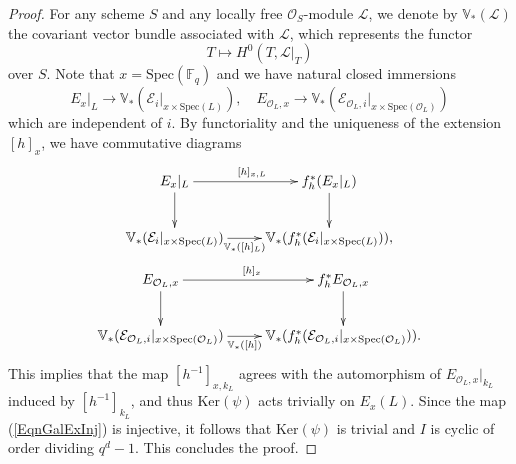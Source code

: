 \documentclass[10pt]{amsart}
\theoremstyle{plain}
\theoremstyle{definition}
\newcommand{\Ker}{\mathrm{Ker}}
\newcommand{\Spec}{\mathrm{Spec}}
\newcommand{\cE}{\mathcal{E}}
\newcommand{\cL}{\mathcal{L}}
\newcommand{\cO}{\mathcal{O}}
\newcommand{\bF}{\mathbb{F}}
\newcommand{\bV}{\mathbb{V}}
\begin{document}
\begin{proof}
	
	For any scheme $S$ and any locally free $\cO_S$-module $\cL$, we denote by $\bV_*(\cL)$ the covariant vector bundle associated with $\cL$,
	which represents the functor
	\[
	T\mapsto H^0(T,\cL|_T)
	\]
	over $S$.
	Note that $x=\Spec(\bF_q)$ and we have natural closed immersions 
	\[
	E_x|_L\to \bV_*(\cE_i|_{x\times \Spec(L)}),\quad E_{\cO_L,x}\to \bV_*(\cE_{\cO_L,i}|_{x\times \Spec(\cO_L)})
	\]
	which are independent of $i$. 
	By functoriality and the uniqueness of the extension $[h]_x$, we have commutative diagrams
	\[
	\begin{gathered}
	\xymatrix{
		E_x|_L\ar[r]^{[h]_{x,L}}\ar[d] & f_h^*(E_x|_L)\ar[d] \\
		\bV_*(\cE_i|_{x\times \Spec(L)})\ar[r]_-{\bV_*([h]_L)} & \bV_*(f_h^*(\cE_i|_{x\times \Spec(L)})),
	}\\
\xymatrix{
	E_{\cO_L,x}\ar[d]\ar[r]^{[h]_x}& f_{h}^* E_{\cO_L,x}\ar[d]\\
	\bV_*(\cE_{\cO_L,i}|_{x\times \Spec(\cO_L)})\ar[r]_-{\bV_*([h])} & \bV_*(f_h^*(\cE_{\cO_L,i}|_{x\times \Spec(\cO_L)})).
}
\end{gathered}
	\]
This implies that the map
	$[h^{-1}]_{x,k_L}$ agrees with the automorphism of $E_{\cO_L,x}|_{k_L}$ induced by $[h^{-1}]_{k_L}$,
	and thus $\Ker(\psi)$ acts trivially on $E_x(L)$. Since the map (\ref{EqnGalExInj}) is injective,
	it follows that $\Ker(\psi)$ is trivial and $I$ is cyclic of order dividing $q^d-1$. This concludes the proof.
\end{proof}
\end{document}
